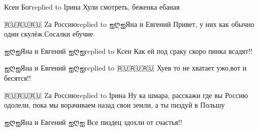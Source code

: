  
 
 
 
 

Ксен Богreplied to Ірина
Хули смотреть, беженка ебаная

🇷🇺🇷🇺🇷🇺 Zа Россиюreplied to ஐღஐЯна и Евгений
Привет, у них как обычно один скулёж.Сосалки ебучие.

ஐღஐЯна и Евгений ஐღஐreplied to Ксен
Как ей под сраку скоро пинка всадят!!

ஐღஐЯна и Евгений ஐღஐreplied to 🇷🇺🇷🇺🇷🇺
Хуев то не хватает ужо,вот и бесятся!!

🇷🇺🇷🇺🇷🇺 Zа Россиюreplied to Ірина
Ну ка шмара, расскажи где вы Россию одолели, пока мы ворачиваем назад свои земли, а ты пиздуй в Польшу

ஐღஐЯна и Евгений ஐღஐ
Все пиздец здохли от счастья!!
